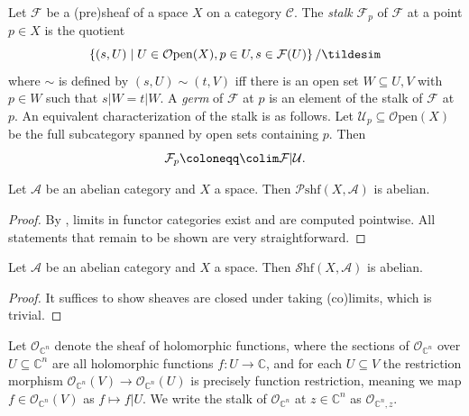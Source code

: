 \begin{definition}\label{1.1.15}
	Let $\mathcal{F} $ be a (pre)sheaf of a space $X$ on a category $\mathcal{C} $. The \emph{stalk} $\mathcal{F} _p$ of $\mathcal{F} $ at a point $p\in X$ is the quotient
	\[
		\left\{ (s,U)\mid U\in \mathcal{O} \mathrm{pen} (X),p\in U,s\in \mathcal{F} (U) \right\} /\tildesim 
	\]
	where $\sim $ is defined by $(s,U)\sim (t,V)$ iff there is an open set $W\subseteq U,V$ with $p\in W$ such that $s|W=t|W$. A \emph{germ} of $\mathcal{F} $ at $p$ is an element of the stalk of $\mathcal{F} $ at $p$. An equivalent characterization of the stalk is as follows. Let $\mathcal{U}_p \subseteq \mathcal{O} \mathrm{pen} (X)$ be the full subcategory spanned by open sets containing $p$. Then
	\[
		\mathcal{F} _p\coloneqq \colim \mathcal{F} |\mathcal{U} 
	.\]
\end{definition}
\begin{proposition}\label{1.1.16}
	Let $\mathcal{A}$ be an abelian category and $X$ a space. Then $\mathcal{P} \mathrm{shf} (X,\mathcal{A} )$ is abelian.
\end{proposition}
\begin{proof}
	By \cite{ml}, limits in functor categories exist and are computed pointwise. All statements that remain to be shown are very straightforward.
\end{proof}
\begin{corollary}\label{1.1.17}
	Let $\mathcal{A} $ be an abelian category and $X$ a space. Then $\mathcal{S} \mathrm{hf} (X,\mathcal{A} )$ is abelian.
\end{corollary}
\begin{proof}
	It suffices to show sheaves are closed under taking (co)limits, which is trivial.
\end{proof}

\begin{example}
	Let $\mathcal{O} _{\mathbb{C} ^n} $ denote the sheaf of holomorphic functions, where the sections of $\mathcal{O} _{\mathbb{C} ^n} $ over $U\subseteq \mathbb{C} ^n$ are all holomorphic functions $f : U \to \mathbb{C} $, and for each $U\subseteq V$ the restriction morphism $\mathcal{O} _{\mathbb{C} ^n} (V)\to \mathcal{O} _{\mathbb{C} ^n} (U)$ is precisely function restriction, meaning we map $f\in \mathcal{O} _{\mathbb{C} ^n} (V)$ as $f\mapsto f|U$. We write the stalk of $\mathcal{O} _{\mathbb{C} ^n} $ at $z\in\mathbb{C} ^n$ as $\mathcal{O} _{\mathbb{C} ^n,z} $.
\end{example}

